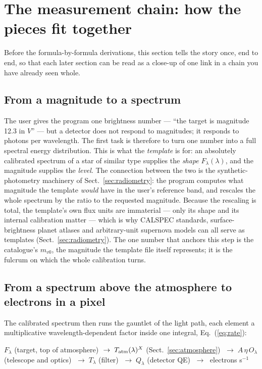 \section{The measurement chain: how the pieces fit together}
\label{sec:chain}

Before the formula-by-formula derivations, this section tells the story
once, end to end, so that each later section can be read as a close-up of
one link in a chain you have already seen whole.

\subsection{From a magnitude to a spectrum}

The user gives the program one brightness number --- ``the target is
magnitude 12.3 in $V$'' --- but a detector does not respond to
magnitudes; it responds to photons per wavelength. The first task is
therefore to turn one number into a full spectral energy distribution.
This is what the \emph{template} is for: an absolutely calibrated
spectrum of a star of similar type supplies the \emph{shape}
$F_\lambda(\lambda)$, and the magnitude supplies the \emph{level}. The
connection between the two is the synthetic-photometry machinery of
Sect.~\ref{sec:radiometry}: the program computes what magnitude the
template \emph{would} have in the user's reference band, and rescales the
whole spectrum by the ratio to the requested magnitude. Because the
rescaling is total, the template's own flux units are immaterial --- only
its shape and its internal calibration matter --- which is why CALSPEC
standards, surface-brightness planet atlases and arbitrary-unit
supernova models can all serve as templates
(Sect.~\ref{sec:radiometry}). The one number that anchors this step is
the catalogue's $m_{v0}$, the magnitude the template file itself
represents; it is the fulcrum on which the whole calibration turns.

\subsection{From a spectrum above the atmosphere to electrons in a pixel}

The calibrated spectrum then runs the gauntlet of the light path, each
element a multiplicative wavelength-dependent factor inside one integral,
Eq.~(\ref{eq:rate}):

\begin{center}
$F_\lambda$ (target, top of atmosphere)
$\;\rightarrow\; T_{\rm atm}(\lambda)^{X}$ (Sect.~\ref{sec:atmosphere})
$\;\rightarrow\; A\,\eta\,O_\lambda$ (telescope and optics)
$\;\rightarrow\; T_\lambda$ (filter)
$\;\rightarrow\; Q_\lambda$ (detector QE)
$\;\rightarrow\;$ electrons s$^{-1}$
\end{center}

